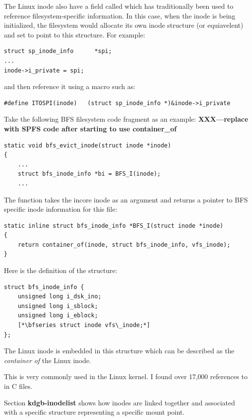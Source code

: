 The Linux inode also have a field called  which has traditionally been used to reference filesystem-specific information. In this case, when the inode is being initialized, the filesystem would allocate its own inode structure (or equiavelent) and set  to point to this structure. For example:

\begin{lstlisting}
struct sp_inode_info      *spi;
...
inode->i_private = spi;
\end{lstlisting}

\noindent
and then reference it using a macro such as:

\begin{lstlisting}
#define ITOSPI(inode)   (struct sp_inode_info *)&inode->i_private
\end{lstlisting}

\noindent
Take the following BFS filesystem code fragment as an example: \textbf{XXX---replace with SPFS code after starting to use container\_of}

\begin{lstlisting}
static void bfs_evict_inode(struct inode *inode)
{
    ...
    struct bfs_inode_info *bi = BFS_I(inode);
    ...
\end{lstlisting}

\noindent
The  function takes the incore inode as an argument and returns a pointer to BFS specific inode information for this file:

\begin{lstlisting}
static inline struct bfs_inode_info *BFS_I(struct inode *inode)
{
    return container_of(inode, struct bfs_inode_info, vfs_inode);
}
\end{lstlisting}

\noindent
Here is the definition of the  structure:

\begin{lstlisting}
struct bfs_inode_info {
    unsigned long i_dsk_ino; 
    unsigned long i_sblock;
    unsigned long i_eblock;
    [*\bfseries struct inode vfs\_inode;*]
};
\end{lstlisting}

\noindent
The Linux inode is embedded in this structure which can be described as the \textit{container of} the Linux inode.

This is very commonly used in the Linux kernel. I found over 17,000 references to  in C files. 

Section \textbf{kdgb-inodelist} shows how inodes are linked together and associated with a specific  structure representing a specific mount point. 

